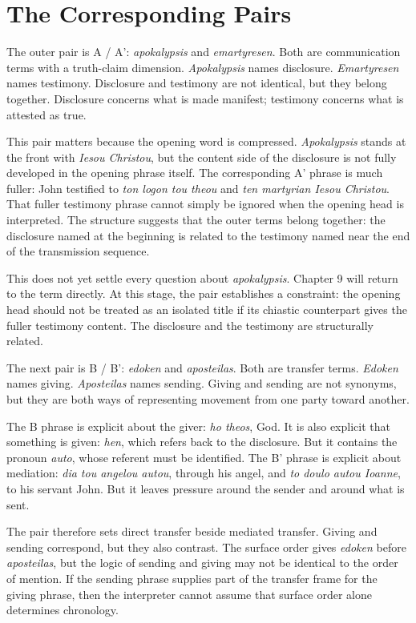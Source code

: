 \section{The Corresponding Pairs}

The outer pair is A / A': \textit{apokalypsis} and \textit{emartyresen}. Both are communication terms with a truth-claim dimension. \textit{Apokalypsis} names disclosure. \textit{Emartyresen} names testimony. Disclosure and testimony are not identical, but they belong together. Disclosure concerns what is made manifest; testimony concerns what is attested as true.

This pair matters because the opening word is compressed. \textit{Apokalypsis} stands at the front with \textit{Iesou Christou}, but the content side of the disclosure is not fully developed in the opening phrase itself. The corresponding A' phrase is much fuller: John testified to \textit{ton logon tou theou} and \textit{ten martyrian Iesou Christou}. That fuller testimony phrase cannot simply be ignored when the opening head is interpreted. The structure suggests that the outer terms belong together: the disclosure named at the beginning is related to the testimony named near the end of the transmission sequence.

This does not yet settle every question about \textit{apokalypsis}. Chapter 9 will return to the term directly. At this stage, the pair establishes a constraint: the opening head should not be treated as an isolated title if its chiastic counterpart gives the fuller testimony content. The disclosure and the testimony are structurally related.

The next pair is B / B': \textit{edoken} and \textit{aposteilas}. Both are transfer terms. \textit{Edoken} names giving. \textit{Aposteilas} names sending. Giving and sending are not synonyms, but they are both ways of representing movement from one party toward another.

The B phrase is explicit about the giver: \textit{ho theos}, God. It is also explicit that something is given: \textit{hen}, which refers back to the disclosure. But it contains the pronoun \textit{auto}, whose referent must be identified. The B' phrase is explicit about mediation: \textit{dia tou angelou autou}, through his angel, and \textit{to doulo autou Ioanne}, to his servant John. But it leaves pressure around the sender and around what is sent.

The pair therefore sets direct transfer beside mediated transfer. Giving and sending correspond, but they also contrast. The surface order gives \textit{edoken} before \textit{aposteilas}, but the logic of sending and giving may not be identical to the order of mention. If the sending phrase supplies part of the transfer frame for the giving phrase, then the interpreter cannot assume that surface order alone determines chronology.

